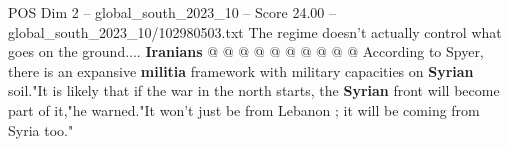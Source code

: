 \begin{textsample}{POS Dim 2 – global\_south\_2023\_10 – Score 24.00 – global\_south\_2023\_10/102980503.txt}
The regime doesn't actually control what goes on the ground.... \textbf{Iranians} @ @ @ @ @ @ @ @ @ @ According to Spyer, there is an expansive \textbf{militia} framework with military capacities on \textbf{Syrian} soil."It is likely that if the war in the north starts, the \textbf{Syrian} front will become part of it,"he warned."It won't just be from Lebanon ; it will be coming from Syria too."

\end{textsample}
